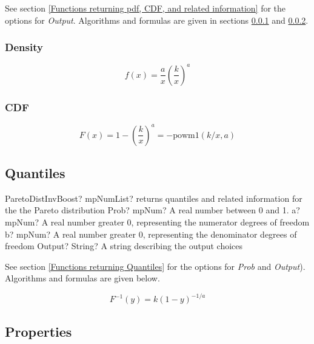 \vspace{0.3cm}
See section \ref{Functions returning pdf, CDF, and related information} for the options for {\itshape\sffamily Output}. Algorithms and formulas are given in sections \ref{ParetoDistributionDensity} and \ref{ParetoDistributionCDF}.

\subsubsection{Density}
\label{ParetoDistributionDensity}

\begin{equation} 
	f(x)= \frac{a}{x} \left(\frac{k}{x}\right)^a
\end{equation}


\subsubsection{CDF}
\label{ParetoDistributionCDF}

\vspace{0.3cm}
\begin{equation} 
	F(x)= 1 - \left(\frac{k}{x}\right)^a = - \text{powm1}(k/x,a)
\end{equation}



\subsection{Quantiles}
\begin{mpFunctionsExtract}
	\mpFunctionFour
	{ParetoDistInvBoost? mpNumList? returns quantiles and related information for the the Pareto distribution}
	{Prob? mpNum? A real number between 0 and 1.}
	{a? mpNum? A real number greater 0, representing the numerator  degrees of freedom}
	{b? mpNum? A real number greater 0, representing the denominator degrees of freedom}
	{Output? String? A string describing the output choices}
\end{mpFunctionsExtract}

See section \ref{Functions returning Quantiles} for the options for  {\itshape\sffamily Prob} and {\itshape\sffamily Output}). Algorithms and formulas are given below.

\begin{equation} 
	F^{-1}(y)= k(1-y)^{-1/a}
\end{equation}



\subsection{Properties}
\label{ParetoDistributionProperties}

